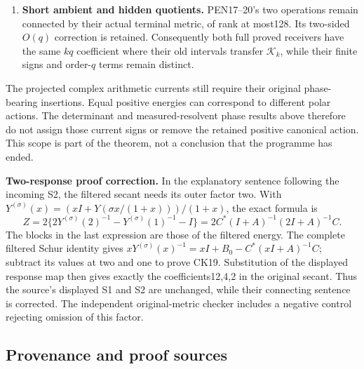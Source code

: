 \documentclass[10pt]{article}
\begin{document}
\begin{enumerate}
  \textbf{Frequency recovery.} PT12--22 now receive \(\mathcal B=D_0+D_1+\sum_NE_N=o(kq)\), since \(\sum_NE_N\le4\Delta e_k\). They prove the entire measured phase transition in integral norm, with finite error, and the controlled root-scale phase-area correction. The new independent SF1--36 sharp angle bounds further strengthen the frequency error. These equations supersede the newest archive's isolated statement that its leading determinant coefficient is unevaluated.
\item
  \textbf{Short ambient and hidden quotients.} PEN17--20's two operations remain connected by their actual terminal metric, of rank at most128. Its two-sided \(O(q)\) correction is retained. Consequently both full proved receivers have the same \(kq\) coefficient where their old intervals transfer \(\mathcal K_k\), while their finite signs and order-\(q\) terms remain distinct.
\end{enumerate}

The projected complex arithmetic currents still require their original phase-bearing insertions. Equal positive energies can correspond to different polar actions. The determinant and measured-resolvent phase results above therefore do not assign those current signs or remove the retained positive canonical action. This scope is part of the theorem, not a conclusion that the programme has ended.

\textbf{Two-response proof correction.} In the explanatory sentence following the incoming S2, the filtered secant needs its outer factor two. With \(Y^{(\sigma)}(x)=(xI+Y(\sigma x/(1+x)))/(1+x)\), the exact formula is \[
 Z=2\{2Y^{(\sigma)}(2)^{-1}-Y^{(\sigma)}(1)^{-1}-I\}
 =2C^*(I+A)^{-1}(2I+A)^{-1}C.
 \tag{CK19}
\] The blocks in the last expression are those of the filtered energy. The complete filtered Schur identity gives \(xY^{(\sigma)}(x)^{-1}=xI+B_0-C^*(xI+A)^{-1}C\); subtract its values at two and one to prove CK19. Substitution of the displayed response map then gives exactly the coefficients12,4,2 in the original secant. Thus the source's displayed S1 and S2 are unchanged, while their connecting sentence is corrected. The independent original-metric checker includes a negative control rejecting omission of this factor.

\subsection{Provenance and proof sources}\label{provenance-and-proof-sources}
\end{document}

